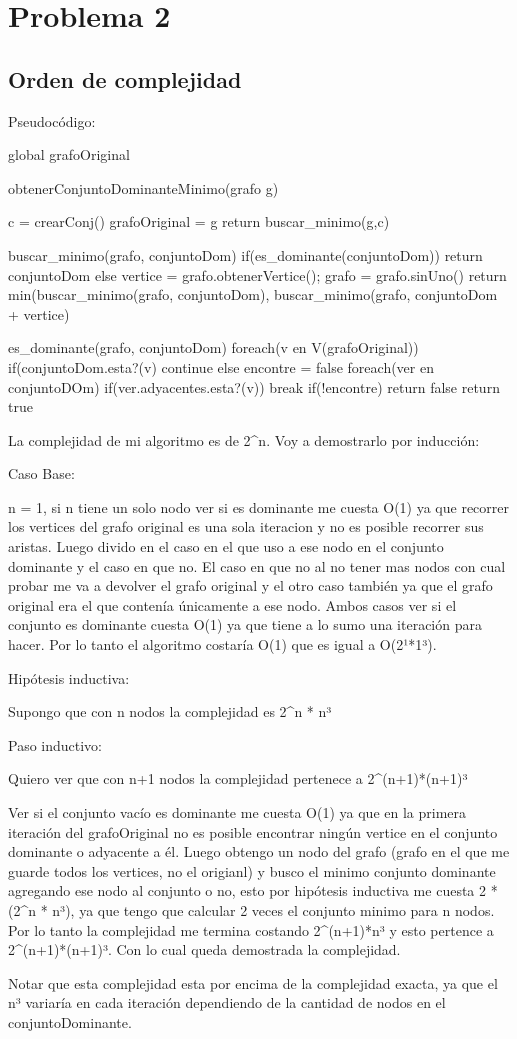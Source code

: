 \section{Problema 2}

\subsection{Orden de complejidad}

Pseudocódigo:

global grafoOriginal

obtenerConjuntoDominanteMinimo(grafo g){
c = crearConj()
grafoOriginal = g
return buscar_minimo(g,c)

}

buscar_minimo(grafo, conjuntoDom){
	if(es_dominante(conjuntoDom)){
		return conjuntoDom
	}else{
		vertice = grafo.obtenerVertice(); 
		grafo = grafo.sinUno()
		return min(buscar_minimo(grafo, conjuntoDom), buscar_minimo(grafo, conjuntoDom + vertice)
	}
}

es_dominante(grafo, conjuntoDom){
	foreach(v en V(grafoOriginal)){
		if(conjuntoDom.esta?(v){
			continue
		}else{
			encontre = false
			foreach(ver en conjuntoDOm){
				if(ver.adyacentes.esta?(v))
					break
			}
			if(!encontre)
				return false
		}
	}
	return true
}

La complejidad de mi algoritmo es de 2^n. Voy a demostrarlo por inducción:

Caso Base:

n = 1, si n tiene un solo nodo ver si es dominante me cuesta O(1) ya que recorrer los vertices del grafo original es una sola iteracion y no es posible recorrer sus aristas. Luego divido en el caso en el que uso a ese nodo en el conjunto dominante y el caso en que no. El caso en que no al no tener mas nodos con cual probar me va a devolver el grafo original y el otro caso también ya que el grafo original era el que contenía únicamente a ese nodo. Ambos casos ver si el conjunto es dominante cuesta O(1) ya que tiene a lo sumo una iteración para hacer. Por lo tanto el algoritmo costaría O(1) que es igual a O(2¹*1³).

Hipótesis inductiva:

Supongo que con n nodos la complejidad es 2^n * n³

Paso inductivo:

Quiero ver que con n+1 nodos la complejidad pertenece a 2^(n+1)*(n+1)³

Ver si el conjunto vacío es dominante me cuesta O(1) ya que en la primera iteración del grafoOriginal no es posible encontrar ningún vertice en el conjunto dominante o adyacente a él. Luego obtengo un nodo del grafo (grafo en el que me guarde todos los vertices, no el origianl) y busco el minimo conjunto dominante agregando ese nodo al conjunto o no, esto por hipótesis inductiva me cuesta 2 * (2^n * n³), ya que tengo que calcular 2 veces el conjunto minimo para n nodos. Por lo tanto la complejidad me termina costando  2^(n+1)*n³ y esto pertence a 2^(n+1)*(n+1)³. Con lo cual queda demostrada la complejidad.

Notar que esta complejidad esta por encima de la complejidad exacta, ya que el n³ variaría en cada iteración dependiendo de la cantidad de nodos en el conjuntoDominante.
